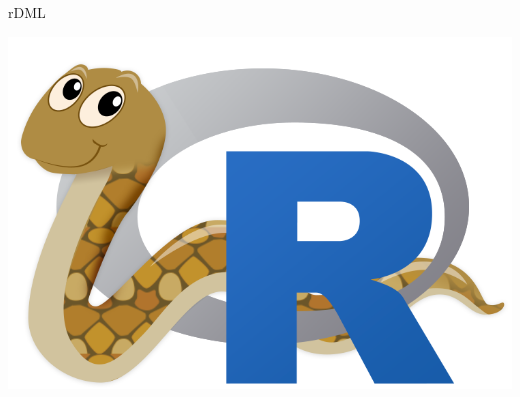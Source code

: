 \documentclass[10pt, compress]{beamer}
\begin{document}
\begin{frame}{rDML}
\begin{center}
    \hspace{0.1\textwidth}
    \includegraphics[height=0.1\textheight]{images/reticulated_python.png}
  \end{center}
\end{frame}
\end{document}
